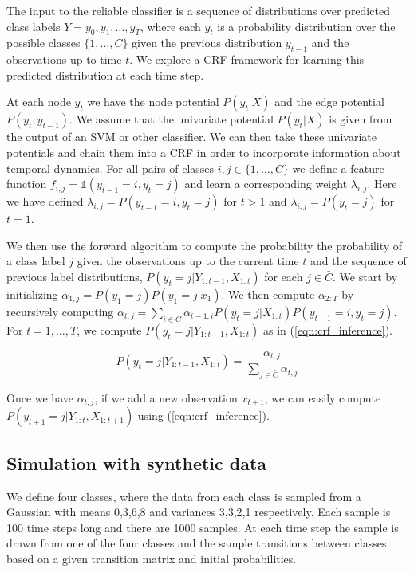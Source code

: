 \documentclass[12pt,solutions]{article}
\begin{document}
The input to the reliable classifier is a sequence of distributions over predicted class labels $Y = y_0, y_1, \ldots, y_T$, where each $y_t$ is a probability distribution over the possible classes $\{1,\ldots,C\}$ given the previous distribution $y_{t-1}$ and the observations up to time $t$. We explore a CRF framework for learning this predicted distribution at each time step.

At each node $y_t$ we have the node potential $P(y_t|X)$ and the edge potential $P(y_t, y_{t-1})$. We assume that the univariate potential $P(y_t|X)$ is given from the output of an SVM or other classifier. We can then take these univariate potentials and chain them into a CRF in order to incorporate information about temporal dynamics. For all pairs of classes $i,j \in \{1,\ldots,C\}$ we define a feature function $f_{i,j} = \mathbb{1}(y_{t-1}=i, y_{t}=j)$ and learn a corresponding weight $\lambda_{i,j}$. Here we have defined $\lambda_{i,j} = P(y_{t-1} = i,y_t=j)$ for $t >1$ and $\lambda_{i,j} = P(y_t=j)$ for $t =1$.

We then use the forward algorithm to compute the probability the probability of a class label $j$ given the observations up to the current time $t$ and the sequence of previous label distributions, $P(y_t =j| Y_{1:t-1}, X_{1:t}) $ for each $j \in \bar{C}$. We start by initializing $\alpha_{1,j} = P(y_1=j)P(y_1=j|x_1)$. We then compute $\alpha_{2:T}$ by recursively computing $\alpha_{t,j} = \sum_{i \in \bar{C}}\alpha_{t-1,i}P(y_t=j|X_{1:t})P(y_{t-1} = i,y_t=j)$. For $t=1,\ldots, T$, we compute $P(y_t =j| Y_{1:t-1}, X_{1:t}) $ as in (\ref{eqn:crf_inference}).

\begin{equation}
P(y_t=j | Y_{1:t-1}, X_{1:t}) = \frac{\alpha_{t,j}}{\sum_{j \in \bar{C}}\alpha_{t,j}} \label{eqn:crf_inference}
\end{equation}
 
Once we have $\alpha_{t,j} $, if we add a new observation $x_{t+1}$, we can easily compute $P(y_{t+1}=j | Y_{1:t}, X_{1:t+1})$ using (\ref{eqn:crf_inference}).

\subsection{Simulation with synthetic data}

We define four classes, where the data from each class is sampled from a Gaussian with means 0,3,6,8 and variances 3,3,2,1 respectively. Each sample is 100 time steps long and there are 1000 samples. At each time step the sample is drawn from one of the four classes and the sample transitions between classes based on a given transition matrix and initial probabilities.
\end{document}
